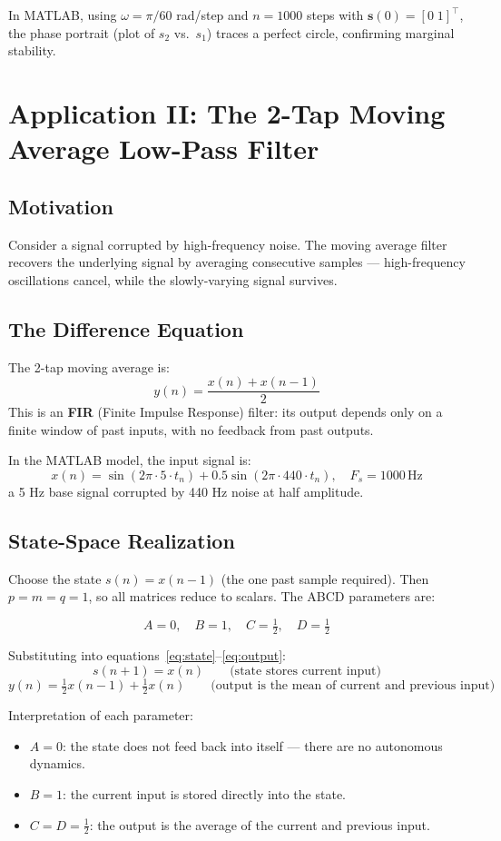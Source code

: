 \documentclass[11pt]{article}
\begin{document}
In MATLAB, using $\omega = \pi/60$ rad/step and $n = 1000$ steps with $\mathbf{s}(0) = [0\;1]^\top$, the phase portrait (plot of $s_2$ vs.\ $s_1$) traces a perfect circle, confirming marginal stability.

 
\section{Application II: The 2-Tap Moving Average Low-Pass Filter}

\subsection{Motivation}

Consider a signal corrupted by high-frequency noise. The moving average filter recovers the underlying signal by averaging consecutive samples — high-frequency oscillations cancel, while the slowly-varying signal survives.

\subsection{The Difference Equation}

The 2-tap moving average is:
\[
  y(n) = \frac{x(n) + x(n-1)}{2}
\]
This is an \textbf{FIR} (Finite Impulse Response) filter: its output depends only on a finite window of past inputs, with no feedback from past outputs.

In the MATLAB model, the input signal is:
\[
  x(n) = \sin(2\pi \cdot 5 \cdot t_n) + 0.5\sin(2\pi \cdot 440 \cdot t_n), \quad F_s = 1000\,\text{Hz}
\]
a 5 Hz base signal corrupted by 440 Hz noise at half amplitude.

\subsection{State-Space Realization}

Choose the state $s(n) = x(n-1)$ (the one past sample required). Then $p = m = q = 1$, so all matrices reduce to scalars. The ABCD parameters are:

\[
  A = 0, \quad B = 1, \quad C = \tfrac{1}{2}, \quad D = \tfrac{1}{2}
\]

Substituting into equations~\eqref{eq:state}--\eqref{eq:output}:
\[
  s(n+1) = x(n) \qquad \text{(state stores current input)}
\]
\[
  y(n) = \tfrac{1}{2}x(n-1) + \tfrac{1}{2}x(n) \qquad \text{(output is the mean of current and previous input)}
\]

Interpretation of each parameter:
\begin{itemize}
  \item $A = 0$: the state does not feed back into itself — there are no autonomous dynamics.
  \item $B = 1$: the current input is stored directly into the state.
  \item $C = D = \tfrac{1}{2}$: the output is the average of the current and previous input.
\end{itemize}
\end{document}
